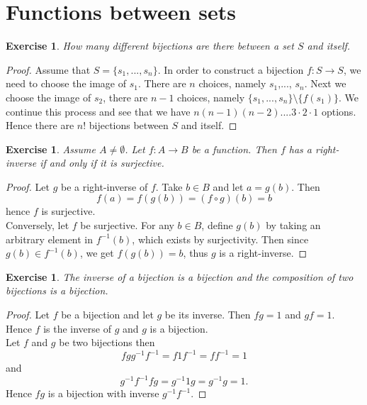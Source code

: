 \documentclass[a4paper, 11pt]{book}
\theoremstyle{plain}
\newtheorem{exercise}[theorem]{Exercise}
\theoremstyle{plain}
\begin{document}
\section{Functions between sets}
\begin{exercise}
How many different bijections are there between a set $S$ and itself.
\end{exercise}
\begin{proof}
Assume that $S = \{s_1,...,s_n\}$. In order to construct a bijection $f:S\rightarrow S$, we need to choose the image of $s_1$. There are $n$ choices, namely $s_1$,..., $s_n$. Next we choose the image of $s_2$, there are $n-1$ choices, namely $\{s_1,...,s_n\}\setminus\{f(s_1)\}$. We continue this process and see that we have $n(n-1)(n-2)....3\cdot 2\cdot 1$ options. Hence there are $n!$ bijections between $S$ and itself.
\end{proof}

\begin{exercise}
Assume $A\neq \emptyset$. Let $f:A\rightarrow B$ be a function. Then $f$ has a right-inverse if and only if it is surjective.
\end{exercise}
\begin{proof}
Let $g$ be a right-inverse of $f$. Take $b\in B$ and let $a=g(b)$. Then
$$f(a) = f(g(b)) = (f\circ g)(b) =b$$
hence $f$ is surjective.\\
Conversely, let $f$ be surjective. For any $b\in B$, define $g(b)$ by taking an arbitrary element in $f^{-1}(b)$, which exists by surjectivity. Then since $g(b)\in f^{-1}(b)$, we get $f(g(b)) = b$, thus $g$ is a right-inverse.
\end{proof}

\begin{exercise}
The inverse of a bijection is a bijection and the composition of two bijections is a bijection.
\end{exercise}
\begin{proof}
Let $f$ be a bijection and let $g$ be its inverse. Then $fg= 1$ and $gf= 1$. Hence $f$ is the inverse of $g$ and $g$ is a bijection.\\
Let $f$ and $g$ be two bijections then 
$$fgg^{-1}f^{-1}= f1f^{-1} = ff^{-1} = 1$$
and
$$g^{-1}f^{-1}fg = g^{-1}1g = g^{-1}g = 1.$$
Hence $fg$ is a bijection with inverse $g^{-1}f^{-1}$.
\end{proof}
\end{document}
